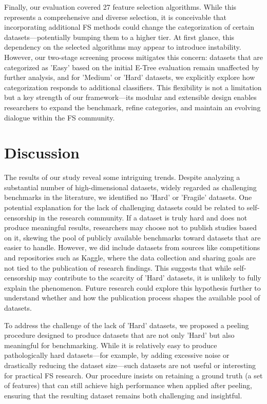 \documentclass[preprint,12pt,authoryear]{elsarticle}
\begin{document}
Finally, our evaluation covered 27 feature selection algorithms. While this represents a comprehensive and diverse selection, it is conceivable that incorporating additional FS methods could change the categorization of certain datasets—potentially bumping them to a higher tier. At first glance, this dependency on the selected algorithms may appear to introduce instability. However, our two-stage screening process mitigates this concern: datasets that are categorized as 'Easy' based on the initial E-Tree evaluation remain unaffected by further analysis, and for 'Medium' or 'Hard' datasets, we explicitly explore how categorization responds to additional classifiers. This flexibility is not a limitation but a key strength of our framework—its modular and extensible design enables researchers to expand the benchmark, refine categories, and maintain an evolving dialogue within the FS community.





\section{Discussion}\label{sec:discussion}


The results of our study reveal some intriguing trends. Despite analyzing a substantial number of high-dimensional datasets, widely regarded as challenging benchmarks in the literature, we identified no 'Hard' or 'Fragile' datasets. One potential explanation for the lack of challenging datasets could be related to self-censorship in the research community. If a dataset is truly hard and does not produce meaningful results, researchers may choose not to publish studies based on it, skewing the pool of publicly available benchmarks toward datasets that are easier to handle. However, we did include datasets from sources like competitions and repositories such as Kaggle, where the data collection and sharing goals are not tied to the publication of research findings. This suggests that while self-censorship may contribute to the scarcity of 'Hard' datasets, it is unlikely to fully explain the phenomenon. Future research could explore this hypothesis further to understand whether and how the publication process shapes the available pool of datasets. 


To address the challenge of the lack of 'Hard' datasets, we proposed a peeling procedure designed to produce datasets that are not only 'Hard' but also meaningful for benchmarking. While it is relatively easy to produce pathologically hard datasets—for example, by adding excessive noise or drastically reducing the dataset size—such datasets are not useful or interesting for practical FS research. Our procedure insists on retaining a ground truth (a set of features) that can still achieve high performance when applied after peeling, ensuring that the resulting dataset remains both challenging and insightful.
\end{document}

